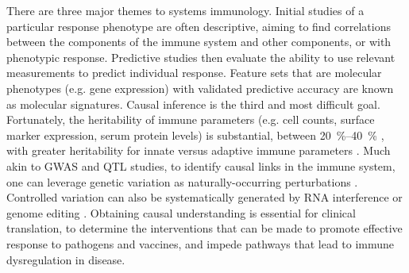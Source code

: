 \begin{outline}
There are three major themes to systems immunology.
Initial studies of a particular response phenotype are often descriptive,
aiming to find correlations between the components of the immune system and other components, or with phenotypic response.
Predictive studies then evaluate the ability to use relevant measurements to predict individual response.
Feature sets that are molecular phenotypes (e.g. gene expression) with validated predictive accuracy are known as molecular signatures.
Causal inference is the third and most difficult goal.
Fortunately, the heritability of immune parameters (e.g. cell counts, surface marker expression, serum protein levels) is substantial, 
between \SIrange{20}{40}{\percent} \autocite{liston2016ShapingVariationHuman,brodin2017HumanImmuneSystem,patin2018NaturalVariationParameters,liston2018OriginsDiversityHuman},
with greater heritability for innate versus adaptive immune parameters \autocite{patin2018NaturalVariationParameters}.
Much akin to \gls{GWAS} and \gls{QTL} studies, to identify causal links in the immune system,
one can leverage genetic variation as naturally-occurring perturbations \autocite{tsang2015UtilizingPopulationVariation,villani2018SystemsImmunologyLearning}.
Controlled variation can also be systematically generated by RNA interference or genome editing \autocite{yosef2016WritLargeGenomic}.
Obtaining causal understanding is essential for clinical translation,
to determine the interventions that can be made to promote effective response to pathogens and vaccines,
and impede pathways that lead to immune dysregulation in disease.



\end{outline}
